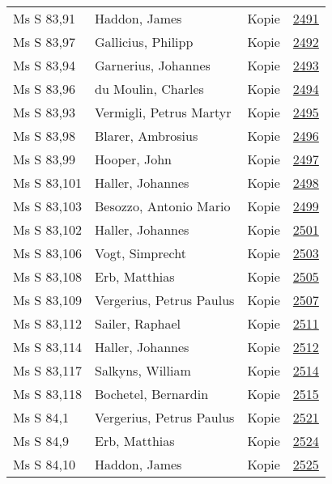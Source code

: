 \documentclass[10pt,a4paper,landscape]{report}
\begin{document}
\begin{longtable}{p{16cm}p{4cm}lr}
Ms S 83,91	&	Haddon, James	&	Kopie	&	\href{http://130.60.24.72/assignment/2491}{2491}\\
Ms S 83,97	&	Gallicius, Philipp	&	Kopie	&	\href{http://130.60.24.72/assignment/2492}{2492}\\
Ms S 83,94	&	Garnerius, Johannes	&	Kopie	&	\href{http://130.60.24.72/assignment/2493}{2493}\\
Ms S 83,96	&	du Moulin, Charles	&	Kopie	&	\href{http://130.60.24.72/assignment/2494}{2494}\\
Ms S 83,93	&	Vermigli, Petrus Martyr	&	Kopie	&	\href{http://130.60.24.72/assignment/2495}{2495}\\
Ms S 83,98	&	Blarer, Ambrosius	&	Kopie	&	\href{http://130.60.24.72/assignment/2496}{2496}\\
Ms S 83,99	&	Hooper, John	&	Kopie	&	\href{http://130.60.24.72/assignment/2497}{2497}\\
Ms S 83,101	&	Haller, Johannes	&	Kopie	&	\href{http://130.60.24.72/assignment/2498}{2498}\\
Ms S 83,103	&	Besozzo, Antonio Mario	&	Kopie	&	\href{http://130.60.24.72/assignment/2499}{2499}\\
Ms S 83,102	&	Haller, Johannes	&	Kopie	&	\href{http://130.60.24.72/assignment/2501}{2501}\\
Ms S 83,106	&	Vogt, Simprecht	&	Kopie	&	\href{http://130.60.24.72/assignment/2503}{2503}\\
Ms S 83,108	&	Erb, Matthias	&	Kopie	&	\href{http://130.60.24.72/assignment/2505}{2505}\\
Ms S 83,109	&	Vergerius, Petrus Paulus	&	Kopie	&	\href{http://130.60.24.72/assignment/2507}{2507}\\
Ms S 83,112	&	Sailer, Raphael	&	Kopie	&	\href{http://130.60.24.72/assignment/2511}{2511}\\
Ms S 83,114	&	Haller, Johannes	&	Kopie	&	\href{http://130.60.24.72/assignment/2512}{2512}\\
Ms S 83,117	&	Salkyns, William	&	Kopie	&	\href{http://130.60.24.72/assignment/2514}{2514}\\
Ms S 83,118	&	Bochetel, Bernardin	&	Kopie	&	\href{http://130.60.24.72/assignment/2515}{2515}\\
Ms S 84,1	&	Vergerius, Petrus Paulus	&	Kopie	&	\href{http://130.60.24.72/assignment/2521}{2521}\\
Ms S 84,9	&	Erb, Matthias	&	Kopie	&	\href{http://130.60.24.72/assignment/2524}{2524}\\
Ms S 84,10	&	Haddon, James	&	Kopie	&	\href{http://130.60.24.72/assignment/2525}{2525}\\

\end{longtable}
\end{document}
